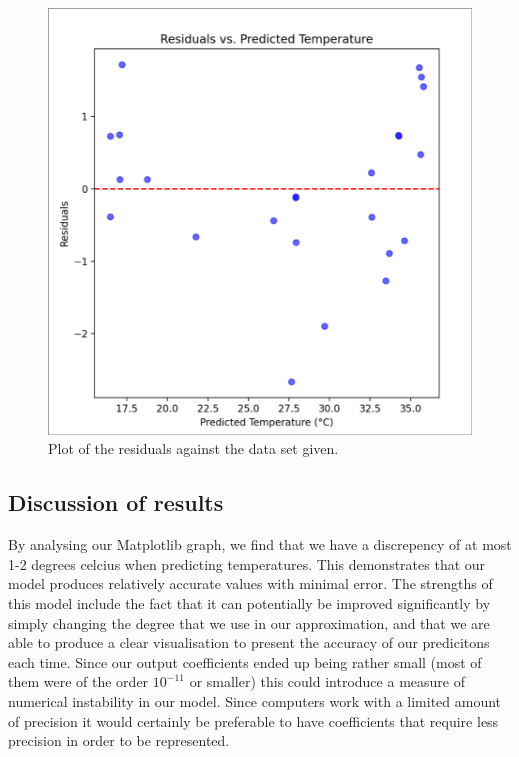 \documentclass[11pt]{article}
\begin{document}
\begin{center}
\begin{figure}[H]
  \centering
  \includegraphics[scale=0.3]{Images/Q1.png}
  \caption{Plot of the residuals against the data set given.}
\end{figure}
\end{center}

\subsection{Discussion of results}

By analysing our Matplotlib graph, we find that we have a discrepency of at most 1-2 degrees celcius when predicting
temperatures. This demonstrates that our model produces relatively accurate values with minimal error. The strengths of this
model include the fact that it can potentially be improved significantly by simply changing the degree that we use in our
approximation, and that we are able to produce a clear visualisation to present the accuracy of our predicitons each time.
Since our output coefficients ended up being rather small (most of them were of the order $10^{-11}$ or smaller) this could
introduce a measure of numerical instability in our model. Since computers work with a limited amount of precision it would
certainly be preferable to have coefficients that require less precision in order to be represented.
\end{document}
